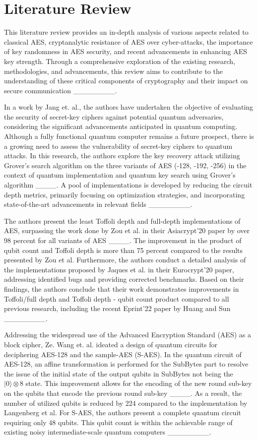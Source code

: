 \section{Literature Review}
\label{sec2}

This literature review provides an in-depth analysis of various aspects related to classical AES, cryptanalytic resistance of AES over cyber-attacks, the importance of key randomness in AES security, and recent advancements in enhancing AES key strength. Through a comprehensive exploration of the existing research, methodologies, and advancements, this review aims to contribute to the understanding of these critical components of cryptography and their impact on secure communication ________. 


In a work by Jang et. al., the authors have undertaken the objective of evaluating the security of secret-key ciphers against potential quantum adversaries, considering the significant advancements anticipated in quantum computing. Although a fully functional quantum computer remains a future prospect, there is a growing need to assess the vulnerability of secret-key ciphers to quantum attacks. In this research, the authors explore the key recovery attack utilizing Grover's search algorithm on the three variants of AES (-128, -192, -256) in the context of quantum implementation and quantum key search using Grover's algorithm ____. A pool of implementations is developed by reducing the circuit depth metrics, primarily focusing on optimization strategies, and incorporating state-of-the-art advancements in relevant fields ________. 


The authors present the least Toffoli depth and full-depth implementations of AES, surpassing the work done by Zou et al. in their Asiacrypt'20 paper by over 98 percent for all variants of AES ____. The improvement in the product of qubit count and Toffoli depth is more than 75 percent compared to the results presented by Zou et al. Furthermore, the authors conduct a detailed analysis of the implementations proposed by Jaques et al. in their Eurocrypt'20 paper, addressing identified bugs and providing corrected benchmarks. Based on their findings, the authors conclude that their work demonstrates improvements in Toffoli/full depth and Toffoli depth - qubit count product compared to all previous research, including the recent Eprint'22 paper by Huang and Sun ________. 


Addressing the widespread use of the Advanced Encryption Standard (AES) as a block cipher, Ze. Wang et. al. ideated a design of quantum circuits for deciphering AES-128 and the sample-AES (S-AES). In the quantum circuit of AES-128, an affine transformation is performed for the SubBytes part to resolve the issue of the initial state of the output qubits in SubBytes not being the $|0\rangle \otimes 8$ state. This improvement allows for the encoding of the new round sub-key on the qubits that encode the previous round sub-key ____. As a result, the number of utilized qubits is reduced by 224 compared to the implementation by Langenberg et al. For S-AES, the authors present a complete quantum circuit requiring only 48 qubits. This qubit count is within the achievable range of existing noisy intermediate-scale quantum computers ________. 


